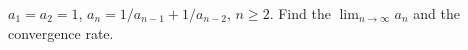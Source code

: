 $a_1 = a_2 = 1$, $a_n = 1/a_{n-1} + 1/a_{n-2}$, $n \geq 2$. Find the $\lim_{n\to\infty} a_n$ and the convergence rate.
